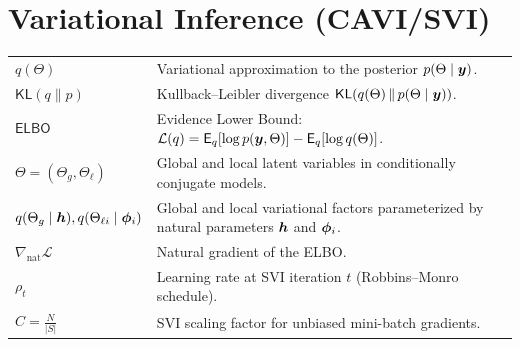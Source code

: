 \vspace{0.5em}
\section*{Variational Inference (CAVI/SVI)}
\begin{tabularx}{\textwidth}{>{\raggedright\arraybackslash}p{4cm} X}
$q(\Theta)$ & Variational approximation to the posterior $p(\Theta\mid\bm{y})$. \\
$\mathsf{KL}\!\left(q\parallel p\right)$ & Kullback–Leibler divergence $\mathsf{KL}\!\left(q(\Theta)\,\|\,p(\Theta\mid\bm{y})\right)$. \\
$\mathsf{ELBO}$ & Evidence Lower Bound: $\mathcal{L}(q)=\mathsf{E}_q\!\left[\log p(\bm{y},\Theta)\right]-\mathsf{E}_q\!\left[\log q(\Theta)\right]$. \\
$\Theta=(\Theta_g,\Theta_\ell)$ & Global and local latent variables in conditionally conjugate models. \\
$q(\Theta_g\mid \bm{h}),q(\Theta_{\ell i}\mid\bm{\phi}_i)$ & Global and local variational factors parameterized by natural parameters $\bm{h}$ and $\bm{\phi}_i$. \\
$\nabla_{\text{nat}} \mathcal{L}$ & Natural gradient of the ELBO. \\
$\rho_t$ & Learning rate at SVI iteration $t$ (Robbins–Monro schedule). \\
$C=\frac{N}{|S|}$ & SVI scaling factor for unbiased mini-batch gradients. \\
\end{tabularx}

\vspace{0.5em}


